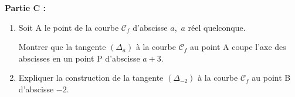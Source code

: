 \bigskip

\textbf{Partie C :}

\medskip

\begin{enumerate}
\item Soit A le point de la courbe $\mathcal{C}_f$ d'abscisse $a$,\, $a$ réel quelconque.

Montrer que la tangente $\left(\Delta_a\right)$ à la courbe $\mathcal{C}_f$ au point A coupe l'axe des abscisses en un point P d'abscisse $a + 3$.
\item Expliquer la construction de la tangente $\left(\Delta_{-2}\right)$  à la courbe $\mathcal{C}_f$ au point B d'abscisse $- 2$.
\end{enumerate}


